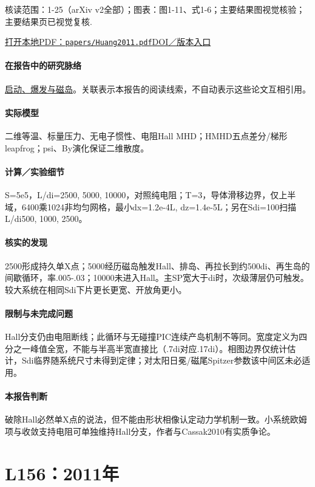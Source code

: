 \documentclass[UTF8,a4paper,11pt,openany,fontset=fandol]{ctexbook}
\begin{document}
\textsf{核读范围：}1-25（arXiv v2全部）；\textsf{图表：}图1-11、式1-6；主要结果图视觉核验；主要结果页已视觉复核.

\href{run:../papers/Huang2011.pdf}{打开本地PDF：\texttt{papers/Huang2011.pdf}}\quad\href{https://doi.org/10.1063/1.3606363}{DOI／版本入口}

\paragraph{在报告中的研究脉络}\hyperref[story:onset]{启动、爆发与磁岛}。关联表示本报告的阅读线索，不自动表示这些论文互相引用。

\paragraph{实际模型}二维等温、标量压力、无电子惯性、电阻Hall MHD；HMHD五点差分/梯形leapfrog；psi、By演化保证二维散度。

\paragraph{计算／实验细节}S=5e5，L/di=2500, 5000, 10000，对照纯电阻；T=3，导体滑移边界，仅上半域，6400乘1024非均匀网格，最小dx=1.2e-4L, dz=1.4e-5L；另在Sdi=100扫描L/di500, 1000, 2500。

\paragraph{核实的发现}2500形成持久单X点；5000经历磁岛触发Hall、排岛、再拉长到约500di、再生岛的间歇循环，率.005-.03；10000未进入Hall。主SP宽大于di时，次级薄层仍可触发。较大系统在相同Sdi下片更长更宽、开放角更小。

\paragraph{限制与未完成问题}Hall分支仍由电阻断线；此循环与无碰撞PIC连续产岛机制不等同。宽度定义为四分之一峰值全宽，不能与半高半宽直接比（.7di对应.17di）。相图边界仅统计估计，Sdi临界随系统尺寸未得到定律；对太阳日冕/磁尾Spitzer参数该中间区未必适用。

\paragraph{本报告判断}破除Hall必然单X点的说法，但不能由形状相像认定动力学机制一致。小系统欧姆项与收敛支持电阻可单独维持Hall分支，作者与Cassak2010有实质争论。

\section{L156：2011年}\label{paper:L156}
\end{document}
